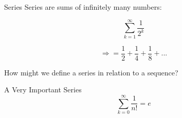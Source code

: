\documentclass[10pt]{beamer}
\begin{document}
\begin{frame}{Series}
Series are sums of infinitely many numbers:

\[\sum_{k=1}^\infty \frac{1}{2^k}\]

\[\Rightarrow = \frac{1}{2} + \frac{1}{4} + \frac{1}{8} + ...\]

How might we define a series in relation to a sequence?
\end{frame}

\begin{frame}{A Very Important Series}
\[\sum_{k=0}^\infty \frac{1}{n!}= e\]    
\end{frame}
\end{document}
